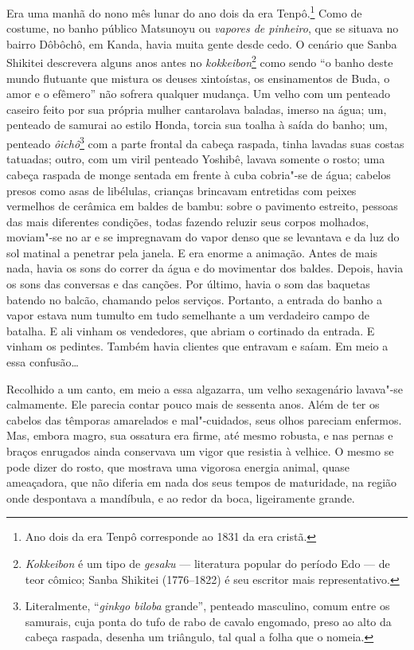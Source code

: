 \noindent{}Era uma manhã do nono mês lunar do ano dois da 
era Tenpô.\footnote{ Ano dois da era Tenpô corresponde ao 1831 da era cristã.} Como de costume, no banho
público Matsunoyu ou \textit{vapores de pinheiro}, que se situava no bairro
Dôbôchô, em Kanda, havia muita gente desde cedo. O cenário que Sanba Shikitei   
descrevera alguns anos antes no \textit{kokkeibon}\footnote{\textit{Kokkeibon} é um 
tipo de \textit{gesaku} --- literatura popular do período Edo --- de teor cômico; Sanba Shikitei (1776--1822) é
seu escritor mais representativo.} como sendo ``o banho deste
mundo flutuante que mistura os deuses xintoístas, os ensinamentos de
Buda, o amor e o efêmero'' não sofrera qualquer mudança. Um velho com um
penteado caseiro feito por sua própria mulher cantarolava baladas,
imerso na água; um, penteado de samurai ao estilo Honda, torcia sua
toalha à saída do banho; um, penteado \textit{ôichô}\footnote{ Literalmente, 
``\textit{ginkgo biloba} grande'', penteado masculino, comum entre 
os samurais, cuja ponta do tufo de rabo de cavalo engomado, preso ao alto da cabeça raspada, 
desenha um triângulo, tal qual a folha que o nomeia.} com a
parte frontal da cabeça raspada, tinha lavadas suas costas tatuadas; outro, 
com um viril penteado Yoshibê, lavava somente o rosto; uma cabeça raspada de
monge sentada em frente à cuba cobria"-se de água; cabelos presos como
asas de libélulas, crianças brincavam entretidas com peixes vermelhos
de cerâmica em baldes de bambu: sobre o pavimento estreito, pessoas das
mais diferentes condições, todas fazendo reluzir seus corpos molhados,
moviam"-se no ar e se impregnavam do vapor denso que se levantava e da
luz do sol matinal a penetrar pela janela. E era enorme a animação.
Antes de mais nada, havia os sons do correr da água e do movimentar dos
baldes. Depois, havia os sons das conversas e das canções. Por último,
havia o som das baquetas batendo no balcão, chamando pelos serviços.
Portanto, a entrada do banho a vapor estava num tumulto em tudo 
semelhante a um verdadeiro campo de batalha. E ali vinham os vendedores, que
abriam o cortinado da entrada. E vinham os pedintes. Também havia
clientes que entravam e saíam. Em meio a essa confusão\ldots{}

Recolhido a um canto, em meio a essa algazarra, um velho sexagenário
lavava"-se calmamente. Ele parecia contar pouco mais de sessenta anos.
Além de ter os cabelos das têmporas amarelados e mal"-cuidados, seus
olhos pareciam enfermos. Mas, embora magro, sua ossatura era firme, até
mesmo robusta, e nas pernas e braços enrugados ainda conservava um
vigor que resistia à velhice. O mesmo se pode dizer do rosto, que
mostrava uma vigorosa energia animal, quase ameaçadora, que não diferia
em nada dos seus tempos de maturidade, na região onde despontava a mandíbula, 
e ao redor da boca, ligeiramente grande.

